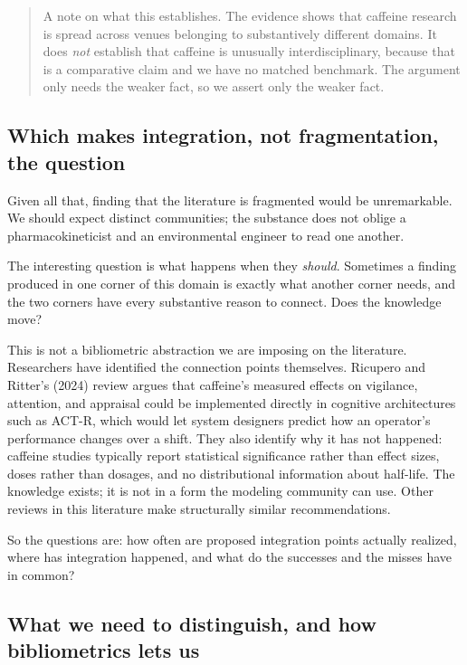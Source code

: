 \documentclass[11pt]{article}
\begin{document}
\begin{quote}
\small
A note on what this establishes. The evidence shows that caffeine research is spread
across venues belonging to substantively different domains. It does \emph{not} establish
that caffeine is unusually interdisciplinary, because that is a comparative claim and we
have no matched benchmark. The argument only needs the weaker fact, so we assert only
the weaker fact.
\end{quote}

\subsection{Which makes integration, not fragmentation, the question}

Given all that, finding that the literature is fragmented would be unremarkable. We
should expect distinct communities; the substance does not oblige a pharmacokineticist
and an environmental engineer to read one another.

The interesting question is what happens when they \emph{should}. Sometimes a finding
produced in one corner of this domain is exactly what another corner needs, and the two
corners have every substantive reason to connect. Does the knowledge move?

This is not a bibliometric abstraction we are imposing on the literature. Researchers
have identified the connection points themselves. Ricupero and Ritter's (2024) review argues
that caffeine's measured effects on vigilance, attention, and appraisal could be
implemented directly in cognitive architectures such as ACT-R, which would let system
designers predict how an operator's performance changes over a shift. They also identify
why it has not happened: caffeine studies typically report statistical significance
rather than effect sizes, doses rather than dosages, and no distributional information
about half-life. The knowledge exists; it is not in a form the modeling community can
use. Other reviews in this literature make structurally similar recommendations.

So the questions are: how often are proposed integration points actually realized, where
has integration happened, and what do the successes and the misses have in common?

\subsection{What we need to distinguish, and how bibliometrics lets us}
\end{document}
